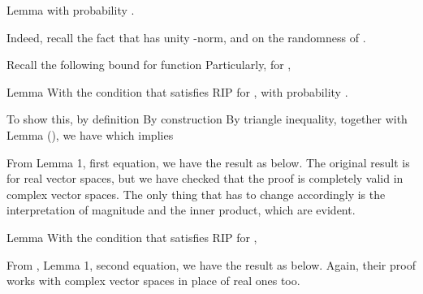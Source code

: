 \Result
{Lemma}
{
with probability .
}

Indeed, recall the fact that  has unity -norm, and on the randomness of .

Recall the following bound for  function
Particularly, for ,

\Result
{Lemma}
{
With the condition that  satisfies RIP for ,
with probability .
}

To show this, by definition
By construction
By triangle inequality, together with Lemma (), we have
which implies

From  Lemma 1, first equation, we have the result as below.
The original result is for real vector spaces, but we have checked that the proof is completely valid in complex vector spaces.
The only thing that has to change accordingly is the interpretation of magnitude and the inner product, which are evident.

\Result
{Lemma}
{
With the condition that  satisfies RIP for ,
}

From , Lemma 1, second equation, we have the result as below.
Again, their proof works with complex vector spaces in place of real ones too.


